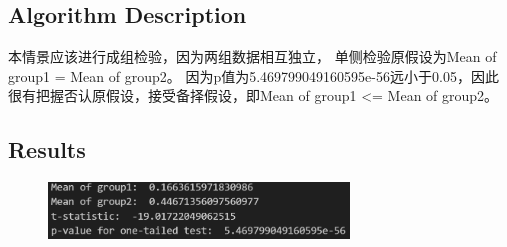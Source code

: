 \documentclass{ctexart}
\begin{document}
	\subsection{Algorithm Description}
	本情景应该进行成组检验，因为两组数据相互独立，
	单侧检验原假设为Mean of group1 = Mean of group2。
	因为p值为5.469799049160595e-56远小于0.05，因此很有把握否认原假设，接受备择假设，即Mean of group1 <= Mean of group2。
\subsection{Results}
\begin{figure}[H]
	\centering 
	\includegraphics[height=1.5cm,width=8cm]{10.png}
	\end{figure}
\end{document}
